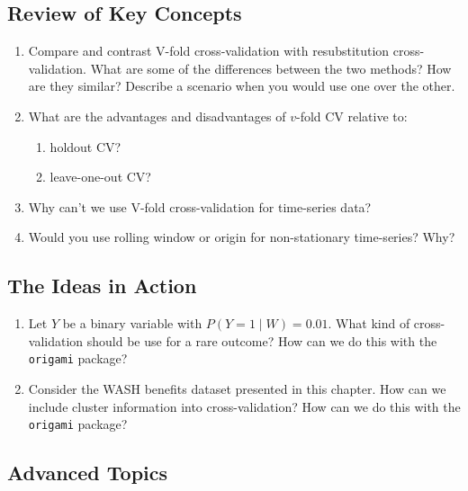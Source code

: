 \documentclass[12pt, krantz2,]{book}
\providecommand{\tightlist}{%
  \setlength{\itemsep}{0pt}\setlength{\parskip}{0pt}}
\theoremstyle{definition}
\theoremstyle{definition}
\theoremstyle{definition}
\newcommand{\1}{\mathbbm{1}}
\begin{document}
\hypertarget{review-of-key-concepts}{%
\subsection{Review of Key Concepts}\label{review-of-key-concepts}}

\begin{enumerate}
\def\labelenumi{\arabic{enumi}.}
\item
  Compare and contrast V-fold cross-validation with resubstitution
  cross-validation. What are some of the differences between the two methods?
  How are they similar? Describe a scenario when you would use one over the
  other.
\item
  What are the advantages and disadvantages of \(v\)-fold CV relative to:

  \begin{enumerate}
  \def\labelenumii{\alph{enumii}.}
  \tightlist
  \item
    holdout CV?
  \item
    leave-one-out CV?
  \end{enumerate}
\item
  Why can't we use V-fold cross-validation for time-series data?
\item
  Would you use rolling window or origin for non-stationary time-series? Why?
\end{enumerate}

\hypertarget{the-ideas-in-action}{%
\subsection{The Ideas in Action}\label{the-ideas-in-action}}

\begin{enumerate}
\def\labelenumi{\arabic{enumi}.}
\item
  Let \(Y\) be a binary variable with \(P(Y=1 \mid W) = 0.01\). What kind of
  cross-validation should be use for a rare outcome? How can we do this with
  the \texttt{origami} package?
\item
  Consider the WASH benefits dataset presented in this chapter. How can we
  include cluster information into cross-validation? How can we do this with
  the \texttt{origami} package?
\end{enumerate}

\hypertarget{advanced-topics}{%
\subsection{Advanced Topics}\label{advanced-topics}}
\end{document}
